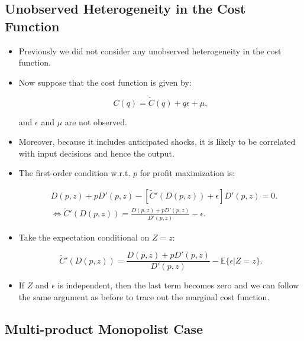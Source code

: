 \documentclass[]{book}
\begin{document}
\subsection{Unobserved Heterogeneity in the Cost
Function}\label{unobserved-heterogeneity-in-the-cost-function}

\begin{itemize}
\item
  Previously we did not consider any unobserved heterogeneity in the
  cost function.
\item
  Now suppose that the cost function is given by:

  \begin{equation}
  C(q) = \tilde{C}(q) + q \epsilon + \mu,
  \end{equation}

  and \(\epsilon\) and \(\mu\) are not observed.
\item
  Moreover, because it includes anticipated shocks, it is likely to be
  correlated with input decisions and hence the output.
\item
  The first-order condition w.r.t. \(p\) for profit maximization is:

  \begin{equation}
  \begin{split}
  &D(p, z) + pD'(p, z) - [\tilde{C}'(D(p, z)) + \epsilon]D'(p, z) = 0.\\
  &\Leftrightarrow \tilde{C}'(D(p, z))  = \frac{D(p, z) + pD'(p, z)}{D'(p,z)} - \epsilon.
  \end{split}
  \end{equation}
\item
  Take the expectation conditional on \(Z = z\):

  \begin{equation}
  \tilde{C}'(D(p, z)) = \frac{D(p, z) + pD'(p, z)}{D'(p, z)} - \mathbb{E}\{\epsilon|Z = z\}.
  \end{equation}
\item
  If \(Z\) and \(\epsilon\) is independent, then the last term becomes
  zero and we can follow the same argument as before to trace out the
  marginal cost function.
\end{itemize}

\subsection{Multi-product Monopolist
Case}\label{multi-product-monopolist-case}
\end{document}
